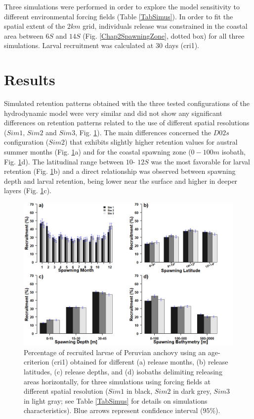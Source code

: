 Three simulations were performed in order to explore the model sensitivity to different environmental forcing fields (Table \ref{TabSimus}). In order to fit the spatial extent of the $2 km$ grid, individuals release was constrained in the coastal area between $6$\textdegree $S$ and $14$\textdegree $S$ (Fig. \ref{Chap2SpawningZone}, dotted box) for all three simulations. Larval recruitment was calculated at $30$ days (\gls{cri1}).\\

\clearpage
\section{Results}\label{Chap2Resu}

Simulated retention patterns obtained with the three tested configurations of the hydrodynamic model were very similar and did not show any significant differences on retention patterns related to the use of different spatial resolutions ($Sim 1$, $Sim 2$ and $Sim 3$, Fig. \ref{Chap2Recruitment3bars}). The main differences concerned the $D02s$ configuration ($Sim 2$) that exhibits slightly higher retention values for austral summer months (Fig. \ref{Chap2Recruitment3bars}a) and for the coastal spawning zone ($0-100m$ isobath, Fig. \ref{Chap2Recruitment3bars}d). The latitudinal range between $10$\textdegree - $12$\textdegree $S$ was the most favorable for larval retention (Fig. \ref{Chap2Recruitment3bars}b) and a direct relationship was observed between spawning depth and larval retention, being lower near the surface and higher in deeper layers (Fig. \ref{Chap2Recruitment3bars}c).\\

\begin{figure}[H]
	\includegraphics[width=1.0\textwidth]{figures/Chap2Recruitment3bars.png}
	\centering
	\caption{Percentage of recruited larvae of Peruvian anchovy using an age-criterion (\gls{cri1}) obtained for different (a) release months, (b) release latitudes, (c) release depths, and (d) isobaths delimiting releasing areas horizontally, for three simulations using forcing fields at different spatial resolution ($Sim 1$ in black, $Sim 2$ in dark grey, $Sim 3$ in light gray; see Table \ref{TabSimus} for details on simulations characteristics). Blue arrows represent confidence interval ($95 \%$).}
	\label{Chap2Recruitment3bars}
\end{figure}

